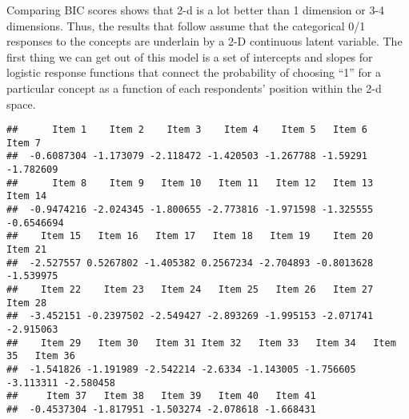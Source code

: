 \documentclass[
]{article}
\newenvironment{Shaded}{\begin{snugshade}}{\end{snugshade}}
\newcommand{\CommentTok}[1]{\textcolor[rgb]{0.56,0.35,0.01}{\textit{#1}}}
\newcommand{\DecValTok}[1]{\textcolor[rgb]{0.00,0.00,0.81}{#1}}
\newcommand{\KeywordTok}[1]{\textcolor[rgb]{0.13,0.29,0.53}{\textbf{#1}}}
\newcommand{\NormalTok}[1]{#1}
\newcommand{\OperatorTok}[1]{\textcolor[rgb]{0.81,0.36,0.00}{\textbf{#1}}}
\newcommand{\StringTok}[1]{\textcolor[rgb]{0.31,0.60,0.02}{#1}}
\begin{document}
Comparing BIC scores shows that 2-d is a lot better than 1 dimension or
3-4 dimensions. Thus, the results that follow assume that the
categorical 0/1 responses to the concepts are underlain by a 2-D
continuous latent variable. The first thing we can get out of this model
is a set of intercepts and slopes for logistic response functions that
connect the probability of choosing ``1'' for a particular concept as a
function of each respondents' position within the 2-d space.

\begin{Shaded}
\end{Shaded}

\begin{verbatim}
##      Item 1    Item 2    Item 3    Item 4    Item 5   Item 6    Item 7
##  -0.6087304 -1.173079 -2.118472 -1.420503 -1.267788 -1.59291 -1.782609
##      Item 8    Item 9   Item 10   Item 11   Item 12   Item 13    Item 14
##  -0.9474216 -2.024345 -1.800655 -2.773816 -1.971598 -1.325555 -0.6546694
##    Item 15   Item 16   Item 17   Item 18   Item 19    Item 20   Item 21
##  -2.527557 0.5267802 -1.405382 0.2567234 -2.704893 -0.8013628 -1.539975
##    Item 22    Item 23   Item 24   Item 25   Item 26   Item 27   Item 28
##  -3.452151 -0.2397502 -2.549427 -2.893269 -1.995153 -2.071741 -2.915063
##    Item 29   Item 30   Item 31 Item 32   Item 33   Item 34   Item 35   Item 36
##  -1.541826 -1.191989 -2.542214 -2.6334 -1.143005 -1.756605 -3.113311 -2.580458
##     Item 37   Item 38   Item 39   Item 40   Item 41
##  -0.4537304 -1.817951 -1.503274 -2.078618 -1.668431
\end{verbatim}

\begin{Shaded}
\end{Shaded}
\end{document}
